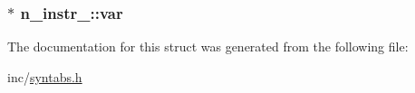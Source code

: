 \subsubsection[{\texorpdfstring{var}{var}}]{$\ast$ n\+\_\+instr\+\_\+\+::var}\hypertarget{structn__instr___a6210eed4fd6f8bd9cfc4072cbba4bfe1}{}\label{structn__instr___a6210eed4fd6f8bd9cfc4072cbba4bfe1}


The documentation for this struct was generated from the following file\+:\begin{DoxyCompactItemize}
\item 
inc/\hyperlink{syntabs_8h}{syntabs.\+h}\end{DoxyCompactItemize}
